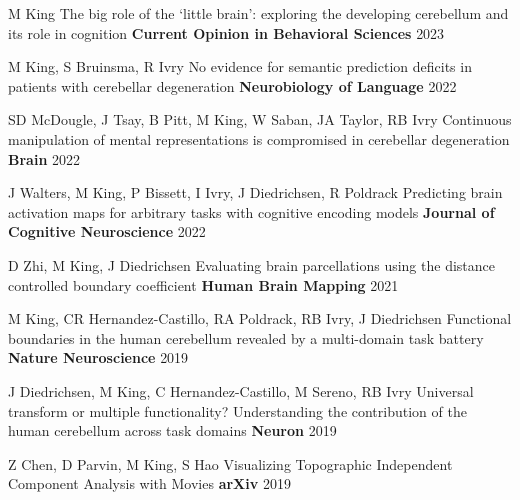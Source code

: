 \begin{cventries}
  \cventry
    {M King} %
    {The big role of the ‘little brain’: exploring the developing cerebellum and its role in cognition} %
    {\textbf{Current Opinion in Behavioral Sciences}} %
    {2023} %
    {}

  \cventry
    {M King, S Bruinsma, R Ivry} %
    {No evidence for semantic prediction deficits in patients with cerebellar degeneration} %
    {\textbf{Neurobiology of Language}} %
    {2022} %
    {}

  \cventry
    {SD McDougle, J Tsay, B Pitt, M King, W Saban, JA Taylor, RB Ivry} %
    {Continuous manipulation of mental representations is compromised in cerebellar degeneration} %
    {\textbf{Brain}} %
    {2022} %
    {}
    
  \cventry
    {J Walters, M King, P Bissett, I Ivry, J Diedrichsen, R Poldrack} %
    {Predicting brain activation maps for arbitrary tasks with cognitive encoding models} %
    {\textbf{Journal of Cognitive Neuroscience}} %
    {2022} %
    {}
   
  \cventry
    {D Zhi, M King, J Diedrichsen} %
    {Evaluating brain parcellations using the distance controlled boundary coefficient} %
    {\textbf{Human Brain Mapping}} %
    {2021} %
    {}
    
  \cventry
    {M King, CR Hernandez-Castillo, RA Poldrack, RB Ivry, J Diedrichsen} %
    {Functional boundaries in the human cerebellum revealed by a multi-domain task battery} %
    {\textbf{Nature Neuroscience}} %
    {2019} %
    {}
    
  \cventry
    {J Diedrichsen, M King, C Hernandez-Castillo, M Sereno, RB Ivry} %
    {Universal transform or multiple functionality? Understanding the contribution of the human cerebellum across task domains} %
    {\textbf{Neuron}} %
    {2019} %
    {}
    
  \cventry
    {Z Chen, D Parvin, M King, S Hao} %
    {Visualizing Topographic Independent Component Analysis with Movies} %
    {\textbf{arXiv}} %
    {2019} %
    {}
    

\end{cventries}

